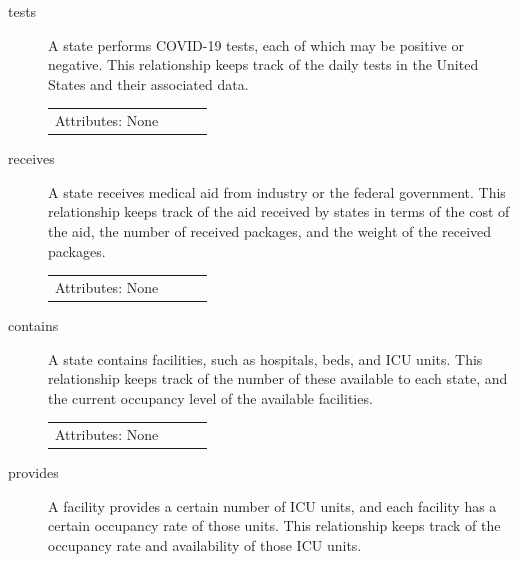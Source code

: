 \documentclass[11pt]{article}
\begin{document}
\begin{description}
\item [tests]

\noindent
A state performs COVID-19 tests, each of which may be positive or negative. This relationship keeps track of the daily tests in the United States and their associated data.

\begin{tabular}{lllc}  
  Attributes: None \\
\end{tabular}

\item [receives]

\noindent
A state receives medical aid from industry or the federal government. This relationship keeps track of the aid received by states in terms of the cost of the aid, the number of received packages, and the weight of the received packages.

\begin{tabular}{lllc}
     Attributes: None \\
\end{tabular}




\item [contains]

\noindent
A state contains facilities, such as hospitals, beds, and ICU units. This relationship keeps track of the number of these available to each state, and the current occupancy level of the available facilities.

\begin{tabular}{lllc}
    Attributes: None \\
\end{tabular}

\item [provides]

\noindent
A facility provides a certain number of ICU units, and each facility has a certain occupancy rate of those units. This relationship keeps track of the occupancy rate and availability of those ICU units.


\end{description}
\end{document}
